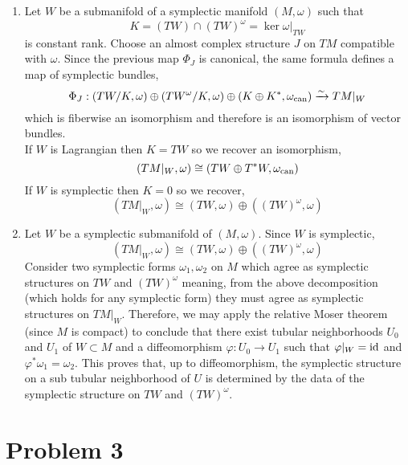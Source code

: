 \documentclass[12pt]{article}
\begin{document}
\begin{enumerate}
\item Let $W$ be a submanifold of a symplectic manifold $(M, \omega)$ such that
\[ K = (TW) \cap (TW)^\omega = \ker{\omega|_{TW}} \]
is constant rank. Choose an almost complex structure $J$ on $TM$ compatible with $\omega$. Since the previous map $\Phi_J$ is canonical, the same formula defines a map of symplectic bundles,
\[ \Phi_J : (TW/K, \omega) \oplus (TW^\omega/K, \omega) \oplus (K \oplus K^*, \omega_{\mathrm{can}}) \xrightarrow{\sim} TM |_W \]
which is fiberwise an isomorphism and therefore is an isomorphism of vector bundles.
\bigskip\\
If $W$ is Lagrangian then $K = TW$ so we recover an isomorphism,
\[ (TM|_W, \omega) \cong (TW \oplus T^*W, \omega_{\mathrm{can}}) \]
If $W$ is symplectic then $K = 0$ so we recover,
\[ (TM|_W, \omega) \cong (TW, \omega) \oplus ((TW)^\omega, \omega) \]

\item Let $W$ be a symplectic submanifold of $(M, \omega)$. Since $W$ is symplectic,
\[ (TM|_W, \omega) \cong (TW, \omega) \oplus ((TW)^\omega, \omega) \]
Consider two symplectic forms $\omega_1, \omega_2$ on $M$ which agree as symplectic structures on $TW$ and $(TW)^\omega$ meaning, from the above decomposition (which holds for any symplectic form) they must agree as symplectic structures on $TM|_W$. Therefore, we may apply the relative Moser theorem (since $M$ is compact) to conclude that there exist tubular neighborhoods $U_0$ and $U_1$ of $W \subset M$ and a diffeomorphism $\varphi : U_0 \to U_1$ such that $\varphi|_W = \mathrm{id}$ and $\varphi^* \omega_1 = \omega_2$. This proves that, up to diffeomorphism, the symplectic structure on a sub tubular neighborhood of $U$ is determined by the data of the symplectic structure on $TW$ and $(TW)^\omega$. 
\end{enumerate}

\section{Problem 3}
\end{document}
